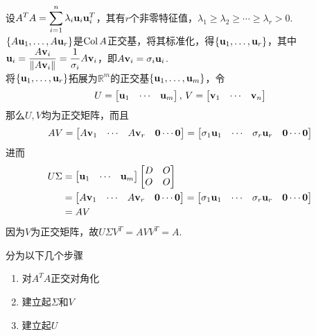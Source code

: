 \begin{analysis}
设$\displaystyle A^TA=\sum_{i=1}^n\lambda_i\mathbf{u}_i\mathbf{u}_i^T$，其有$r$个非零特征值，$\lambda_1\geq\lambda_2\geq\cdots\geq\lambda_r>0$.\\
$\{A\mathbf{u}_1,\dots,A\mathbf{u}_r\}$是$\mathrm{Col}\, A$正交基，将其标准化，得$\{\mathbf{u}_1,\dots,\mathbf{u}_r\}$，其中$\mathbf{u}_i=\dfrac{A\mathbf{v}_i}{\|A\mathbf{v}_i\|}=\dfrac{1}{\sigma_i}A\mathbf{v}_i$，即$A\mathbf{v}_i=\sigma_i\mathbf{u}_i$.\\
将$\{\mathbf{u}_1,\dots,\mathbf{u}_r\}$拓展为$\mathbb{R}^m$的正交基$\{\mathbf{u}_1,\dots,\mathbf{u}_m\}$，令
\[U=\begin{bmatrix}\mathbf{u}_1&\cdots&\mathbf{u}_m\end{bmatrix},\,V=\begin{bmatrix}\mathbf{v}_1&\cdots&\mathbf{v}_n\end{bmatrix}\]
那么$U,V$均为正交矩阵，而且
\[AV=\begin{bmatrix}A\mathbf{v}_1&\cdots&A\mathbf{v}_r&\mathbf{0}\cdots\mathbf{0}\end{bmatrix}=\begin{bmatrix}\sigma_1\mathbf{u}_1&\cdots&\sigma_r\mathbf{u}_r&\mathbf{0}\cdots\mathbf{0}\end{bmatrix}\]
进而
\[\begin{aligned}U\Sigma&=\begin{bmatrix}\mathbf{u}_1&\cdots&\mathbf{u}_m\end{bmatrix}\begin{bmatrix}D&O\\O&O\end{bmatrix}\\
&=\begin{bmatrix}A\mathbf{v}_1&\cdots&A\mathbf{v}_r&\mathbf{0}\cdots\mathbf{0}\end{bmatrix}=\begin{bmatrix}\sigma_1\mathbf{u}_1&\cdots&\sigma_r\mathbf{u}_r&\mathbf{0}\cdots\mathbf{0}\end{bmatrix}\\
&=AV\end{aligned}\]
因为$V$为正交矩阵，故$U\Sigma V^T=AVV^T=A$.
\end{analysis}
\begin{myalgorithm}[奇异值分解]
分为以下几个步骤
\begin{enumerate}
	\itemsep -3pt
	\item 对$A^TA$正交对角化
	\item 建立起$\Sigma$和$V$
	\item 建立起$U$
\end{enumerate}
\end{myalgorithm}


